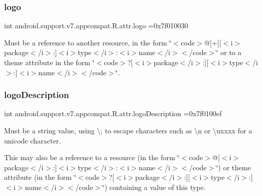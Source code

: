 \subsubsection{\texorpdfstring{logo}{logo}}
{\footnotesize\ttfamily int android.\+support.\+v7.\+appcompat.\+R.\+attr.\+logo =0x7f010030\hspace{0.3cm}{\ttfamily [static]}}

Must be a reference to another resource, in the form \char`\"{}$<$code$>$@\mbox{[}+\mbox{]}\mbox{[}$<$i$>$package$<$/i$>$\+:\mbox{]}$<$i$>$type$<$/i$>$\+:$<$i$>$name$<$/i$>$$<$/code$>$\char`\"{} or to a theme attribute in the form \char`\"{}$<$code$>$?\mbox{[}$<$i$>$package$<$/i$>$\+:\mbox{]}\mbox{[}$<$i$>$type$<$/i$>$\+:\mbox{]}$<$i$>$name$<$/i$>$$<$/code$>$\char`\"{}. \mbox{\label{classandroid_1_1support_1_1v7_1_1appcompat_1_1R_1_1attr_aa0fd67233c5627d649c4a1f72cd41be8}} 
\subsubsection{\texorpdfstring{logo\+Description}{logoDescription}}
{\footnotesize\ttfamily int android.\+support.\+v7.\+appcompat.\+R.\+attr.\+logo\+Description =0x7f0100ef\hspace{0.3cm}{\ttfamily [static]}}

Must be a string value, using \textquotesingle{}\textbackslash{};\textquotesingle{} to escape characters such as \textquotesingle{}\textbackslash{}n\textquotesingle{} or \textquotesingle{}\textbackslash{}uxxxx\textquotesingle{} for a unicode character. 

This may also be a reference to a resource (in the form \char`\"{}$<$code$>$@\mbox{[}$<$i$>$package$<$/i$>$\+:\mbox{]}$<$i$>$type$<$/i$>$\+:$<$i$>$name$<$/i$>$$<$/code$>$\char`\"{}) or theme attribute (in the form \char`\"{}$<$code$>$?\mbox{[}$<$i$>$package$<$/i$>$\+:\mbox{]}\mbox{[}$<$i$>$type$<$/i$>$\+:\mbox{]}$<$i$>$name$<$/i$>$$<$/code$>$\char`\"{}) containing a value of this type. \mbox{\label{classandroid_1_1support_1_1v7_1_1appcompat_1_1R_1_1attr_a0204000e85bcf6c932950a48dfdf1553}} 

